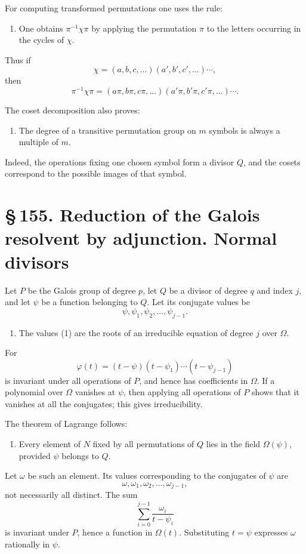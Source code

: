 \documentclass[11pt]{article}
\providecommand{\sect}[2]{\section*{\S\,#1. #2}}
\begin{document}
For computing transformed permutations one uses the rule:
\begin{enumerate}[label=\arabic*.,leftmargin=2em,start=6]
\item One obtains $\pi^{-1}\chi\pi$ by applying the permutation $\pi$ to the letters occurring in the cycles of $\chi$.
\end{enumerate}
Thus if
\[
        \chi=(a,b,c,
\ldots)(a',b',c',
\ldots)\cdots,
\]
then
\[
        \pi^{-1}\chi\pi=(a\pi,b\pi,c\pi,
\ldots)(a'\pi,b'\pi,c'\pi,
\ldots)\cdots.
\]

The coset decomposition also proves:
\begin{enumerate}[label=\arabic*.,leftmargin=2em,start=7]
\item The degree of a transitive permutation group on $m$ symbols is always a multiple of $m$.
\end{enumerate}
Indeed, the operations fixing one chosen symbol form a divisor $Q$, and the cosets correspond to the possible images of that symbol.

\sect{155}{Reduction of the Galois resolvent by adjunction. Normal divisors}

Let $P$ be the Galois group of degree $p$, let $Q$ be a divisor of degree $q$ and index $j$, and let $\psi$ be a function belonging to $Q$. Let its conjugate values be
\[
        \psi,
\psi_1,
\psi_2,
\ldots,
\psi_{j-1}.
\tag{1}
\]

\begin{enumerate}[label=\arabic*.,leftmargin=2em]
\item The values (1) are the roots of an irreducible equation of degree $j$ over $\Omega$.
\end{enumerate}
For
\[
        \varphi(t)=(t-\psi)(t-\psi_1)\cdots(t-\psi_{j-1})
\tag{2}
\]
is invariant under all operations of $P$, and hence has coefficients in $\Omega$. If a polynomial over $\Omega$ vanishes at $\psi$, then applying all operations of $P$ shows that it vanishes at all the conjugates; this gives irreducibility.

The theorem of Lagrange follows:
\begin{enumerate}[label=\arabic*.,leftmargin=2em,start=2]
\item Every element of $N$ fixed by all permutations of $Q$ lies in the field $\Omega(\psi)$, provided $\psi$ belongs to $Q$.
\end{enumerate}

Let $\omega$ be such an element. Its values corresponding to the conjugates of $\psi$ are
\[
        \omega,
\omega_1,
\omega_2,
\ldots,
\omega_{j-1},
\tag{4}
\]
not necessarily all distinct. The sum
\[
        \sum_{i=0}^{j-1}
        \frac{\omega_i}{t-\psi_i}
\]
is invariant under $P$, hence a function in $\Omega(t)$. Substituting $t=\psi$ expresses $\omega$ rationally in $\psi$.
\end{document}
